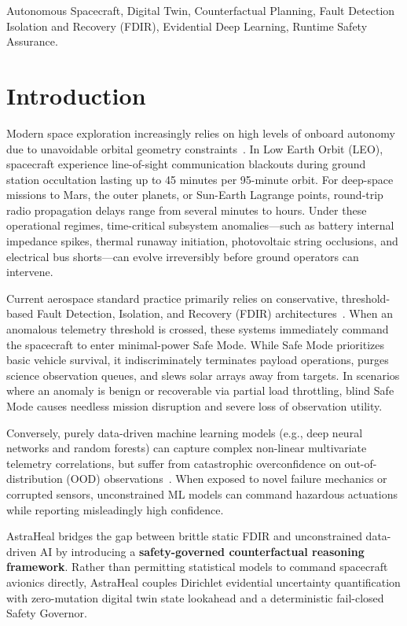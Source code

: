 \documentclass[conference]{IEEEtran}
\begin{document}
\begin{IEEEkeywords}
Autonomous Spacecraft, Digital Twin, Counterfactual Planning, Fault Detection Isolation and Recovery (FDIR), Evidential Deep Learning, Runtime Safety Assurance.
\end{IEEEkeywords}

\section{Introduction}
Modern space exploration increasingly relies on high levels of onboard autonomy due to unavoidable orbital geometry constraints~\cite{chien2005autonomous}. In Low Earth Orbit (LEO), spacecraft experience line-of-sight communication blackouts during ground station occultation lasting up to 45 minutes per 95-minute orbit. For deep-space missions to Mars, the outer planets, or Sun-Earth Lagrange points, round-trip radio propagation delays range from several minutes to hours. Under these operational regimes, time-critical subsystem anomalies—such as battery internal impedance spikes, thermal runaway initiation, photovoltaic string occlusions, and electrical bus shorts—can evolve irreversibly before ground operators can intervene.

Current aerospace standard practice primarily relies on conservative, threshold-based Fault Detection, Isolation, and Recovery (FDIR) architectures~\cite{muscettola1998remote, williams2003model}. When an anomalous telemetry threshold is crossed, these systems immediately command the spacecraft to enter minimal-power Safe Mode. While Safe Mode prioritizes basic vehicle survival, it indiscriminately terminates payload operations, purges science observation queues, and slews solar arrays away from targets. In scenarios where an anomaly is benign or recoverable via partial load throttling, blind Safe Mode causes needless mission disruption and severe loss of observation utility.

Conversely, purely data-driven machine learning models (e.g., deep neural networks and random forests) can capture complex non-linear multivariate telemetry correlations, but suffer from catastrophic overconfidence on out-of-distribution (OOD) observations~\cite{guo2017calibration, lakshminarayanan2017simple}. When exposed to novel failure mechanics or corrupted sensors, unconstrained ML models can command hazardous actuations while reporting misleadingly high confidence.

AstraHeal bridges the gap between brittle static FDIR and unconstrained data-driven AI by introducing a \textbf{safety-governed counterfactual reasoning framework}. Rather than permitting statistical models to command spacecraft avionics directly, AstraHeal couples Dirichlet evidential uncertainty quantification with zero-mutation digital twin state lookahead and a deterministic fail-closed Safety Governor.
\end{document}
